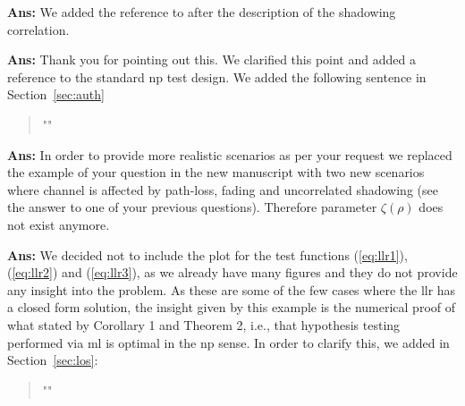 \documentclass[draftcls,onecolumn,12pt]{IEEEtran}
\newcounter{revc}
\newcommand{\revp}[1]{\zref[revcontent]{#1}}
\newcommand{\ie}{i.e., }
\begin{document}
\vspace{5mm} %
\begin{framed}
\end{framed}

{\bf Ans:} We added the reference to \cite[Chapter 2.7]{goldsmith2005} after the description of the shadowing correlation.

\vspace{5mm} %
\begin{framed}
\end{framed}

{\bf Ans:} Thank you for pointing out this. We clarified this point and added a reference to the standard \ac{np} test design. We added the following sentence in Section~\ref{sec:auth}
\begin{quote}
"\revp{lambda}"
\end{quote}

\vspace{5mm} %
\begin{framed}
\end{framed}

{\bf Ans:} In order to provide more realistic scenarios as per your request we replaced the example of your question in the new manuscript with two new scenarios where channel is affected by path-loss, fading and uncorrelated shadowing (see the answer to one of your previous questions). Therefore parameter $\zeta(\rho)$ does not exist anymore. 

\vspace{5mm} %
\begin{framed}
\end{framed}

{\bf Ans:} We decided not to include the plot for the test functions (\ref{eq:llr1}), (\ref{eq:llr2}) and (\ref{eq:llr3}), as we already have many figures and they do not provide any insight into the problem. As these are some of the few cases where the \ac{llr} has a closed form solution, the insight given by this example is the numerical proof of what stated by Corollary 1 and Theorem 2, \ie that hypothesis testing performed via \ac{ml} is optimal in the \ac{np} sense. In order to clarify this, we added in Section~\ref{sec:los}:
\begin{quote}
"\revp{llrComp}"
\end{quote}
\end{document}
